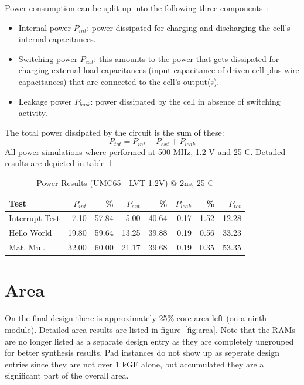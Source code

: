 Power consumption can be split up into the following three components~\cite{Kaeslin08}:
\begin{itemize}
    \item Internal power $P_{int}$: power dissipated for charging and discharging the cell's internal capacitances.
    \item Switching power $P_{ext}$: this amounts to the power that gets dissipated for charging external load capacitances (input capacitance of driven cell plus wire capacitances) that are connected to the cell's output(s).
    \item Leakage power $P_{leak}$: power dissipated by the cell in absence of switching activity.
\end{itemize}
The total power dissipated by the circuit is the sum of these:
\[
    P_{tot} = P_{int} + P_{ext} + P_{leak}
\]
All power simulations where performed at 500 MHz, 1.2 V and 25 \textdegree C. Detailed results are depicted in table~\ref{tab:power}.

\begin{table}[htbp]
 \caption{Power Results (UMC65 - LVT 1.2V) @ 2ns, 25 \textdegree C}
 \label{tab:power}
\begin{tabularx}{\textwidth}{|X||r|r||r|r||r|r||r|}
  \hline
  \textbf{Test} & $P_{int}$& \% & $P_{ext}$ &  \% & $P_{leak}$ &  \% & $P_{tot}$\\ \hline
Interrupt Test & 7.10 & 57.84 & 5.00 &  40.64 & 0.17 & 1.52 & 12.28 \\ \hline
Hello World & 19.80 & 59.64 & 13.25 & 39.88 & 0.19 & 0.56 & 33.23 \\ \hline
Mat. Mul. & 32.00 & 60.00 & 21.17 & 39.68 & 0.19 & 0.35 & 53.35 \\ \hline
  \end{tabularx}
  \end{table}


\section{Area}

On the final design there is approximately 25\% core area left (on a ninth module). Detailed area results are listed in figure~\ref{fig:area}. Note that the RAMs are no longer listed as a separate design entry as they are completely ungrouped for better synthesis results. Pad instances do not show up as seperate design entries since they are not over 1 kGE alone, but accumulated they are a significant part of the overall area.

